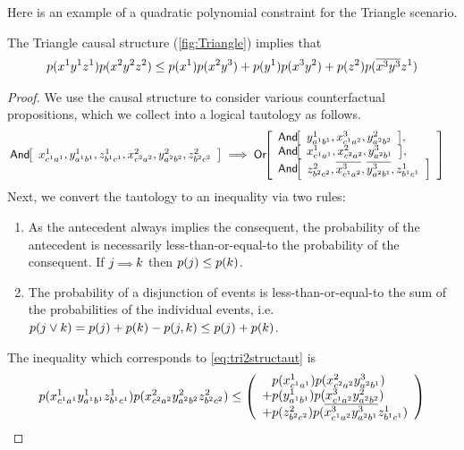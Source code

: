 Here is an example of a quadratic polynomial constraint for the Triangle scenario.
\begin{prop} \label{prop:Deg2}
The Triangle causal structure (\cref{fig:Triangle}) implies that
\begin{align*}
p\lparen x^1 y^1 z^1\rparen p\lparen x^2 y^2 z^2\rparen\leq p\lparen x^1\rparen p\lparen x^2 y^3\rparen+p\lparen y^1\rparen p\lparen x^3 y^2\rparen +p\lparen z^2\rparen p\lparen\overline{x^3} \overline{y^3} z^1\rparen 
\end{align*}
\end{prop}
\begin{proof}
We use the causal structure to consider various counterfactual propositions, which we collect into a logical tautology as follows.
\begin{align}\begin{split}\label{eq:tri2structaut}
&\NamedFunction{And}{ x^1_{c^1 a^1} , y^1_{a^1 b^1} , z^1_{b^1 c^1} , x^2_{c^2 a^2} , y^2_{a^2
   b^2} , z^2_{b^2 c^2} }
 \implies 
\NamedFunction{Or}{
    \NamedFunction{And}{ y^1_{a^1 b^1} , x^3_{c^1 a^2} , y^2_{a^2 b^2} } ,\\
    \NamedFunction{And}{ x^1_{c^1 a^1} , x^2_{c^2 a^2} , y^3_{a^2 b^1} } ,\\
    \NamedFunction{And}{ z^2_{b^2 c^2} , \n{x^3_{c^1 a^2}} , \n{y^3_{a^2 b^1}} , z^1_{b^1 c^1}
   }
}
\end{split}\end{align}
Next, we convert the tautology to an inequality via two rules:
\begin{enumerate}
\item As the antecedent always implies the consequent, the probability of the antecedent is necessarily less-than-or-equal-to the probability of the consequent. If $j \mathord{\scriptstyle \implies} k$ then $p\lparen j\rparen\leq p\lparen k\rparen$.
\item The probability of a disjunction of events is less-than-or-equal-to the sum of the probabilities of the individual events, i.e. ${p\lparen j\lor k\rparen=p\lparen j\rparen+p\lparen k\rparen-p\lparen j,k\rparen\leq p\lparen j\rparen+p\lparen k\rparen}$.
\end{enumerate}
The inequality which corresponds to \cref{eq:tri2structaut} is
\begin{align}\begin{split}\label{eq:tri2structineq}
\p{x^1_{c^1 a^1} y^1_{a^1 b^1} z^1_{b^1 c^1}} \p{x^2_{c^2 a^2} y^2_{a^2 b^2} z^2_{b^2 c^2}}\leq \lparens{
  \hphantom{+}\p{x^1_{c^1 a^1}} \p{x^2_{c^2 a^2} y^3_{a^2 b^1}}
\\+\p{y^1_{a^1 b^1}}\p{x^3_{c^1 a^2} y^2_{a^2 b^2}} 
\\+\p{z^2_{b^2 c^2}}\p{\n{x^3_{c^1 a^2}} \n{y^3_{a^2 b^1}} z^1_{b^1 c^1}} }

\end{split}
\end{align}
\end{proof}
